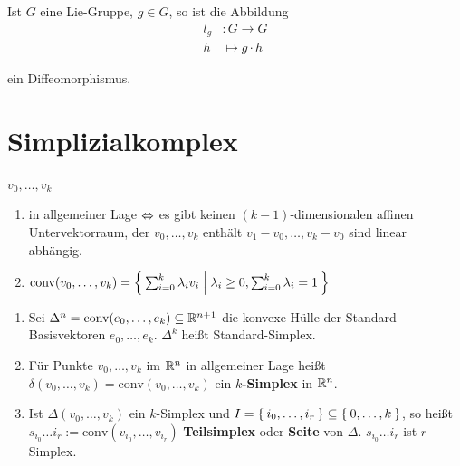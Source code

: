 \begin{bemerkung}
    Ist $G$ eine Lie-Gruppe, $g \in G$, so ist die Abbildung
    \begin{align*}
        l_g &: G \rightarrow G\\
        h  &\mapsto g \cdot h
    \end{align*}

    ein Diffeomorphismus.
\end{bemerkung}

\section{Simplizialkomplex}
\begin{definition}
    $v_0, \dots, v_k$
    \begin{enumerate}[label=\alph*),ref=\theplaindefinition.\alph*]
        \item in allgemeiner Lage $\Leftrightarrow$ es gibt keinen $(k-1)$-dimensionalen
              affinen Untervektorraum, der $v_0, \dots, v_k$ enthält
              \gdw $v_1 - v_0, \dots, v_k - v_0$ sind linear abhängig.
        \item $\text{conv}(v_0, \dots, v_k) = \Set{\sum_{i=0}^k \lambda_i v_i | \lambda_i \geq 0, \sum_{i=0}^k \lambda_i = 1} $
    \end{enumerate}
\end{definition}

\begin{definition}
    \begin{enumerate}[label=\alph*),ref=\theplaindefinition.\alph*]
        \item Sei $\Delta^n = \text{conv}(e_0, \dots, e_k) \subseteq \mathbb{R}^{n+1}$ 
              die konvexe Hülle der Standard-Basisvektoren $e_0, \dots, e_k$.
              $\Delta^k$ heißt Standard-Simplex.
        \item Für Punkte $v_0, \dots, v_k$ im $\mathbb{R}^n$ in allgemeiner
              Lage heißt $\delta (v_0, \dots, v_k) = \text{conv}(v_0, \dots, v_k)$
              ein \textbf{$k$-Simplex} in $\mathbb{R}^n$.
        \item Ist $\Delta (v_0, \dots, v_k)$ ein $k$-Simplex und
              $I = \Set{i_0, \dots, i_r} \subseteq \Set{0, \dots, k}$,
              so heißt $s_{i_0} \dots i_r := \text{conv}(v_{i_0}, \dots, v_{i_r})$
              \textbf{Teilsimplex} oder \textbf{Seite}
              von $\Delta$. $s_{i_0} \dots i_r$ ist $r$-Simplex.
    \end{enumerate}
\end{definition}


